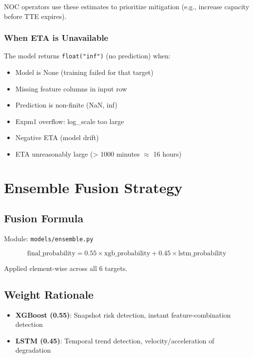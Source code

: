 \documentclass[11pt,a4paper,oneside]{report}
\begin{document}
NOC operators use these estimates to prioritize mitigation (e.g., increase capacity before TTE expires).

\subsection{When ETA is Unavailable}
The model returns \texttt{float("inf")} (no prediction) when:

\begin{itemize}
    \item Model is None (training failed for that target)
    \item Missing feature columns in input row
    \item Prediction is non-finite (NaN, inf)
    \item Expm1 overflow: log\_scale too large
    \item Negative ETA (model drift)
    \item ETA unreasonably large (> 1000 minutes $\approx$ 16 hours)
\end{itemize}
\newpage
\chapter{Ensemble Fusion Strategy}

\section{Fusion Formula}

Module: \texttt{models/ensemble.py}

\begin{equation}
\text{final\_probability} = 0.55 \times \text{xgb\_probability} + 0.45 \times \text{lstm\_probability}
\end{equation}

Applied element-wise across all 6 targets.

\section{Weight Rationale}

\begin{itemize}
    \item \textbf{XGBoost (0.55)}: Snapshot risk detection, instant feature-combination detection
    \item \textbf{LSTM (0.45)}: Temporal trend detection, velocity/acceleration of degradation
\end{itemize}
\end{document}
